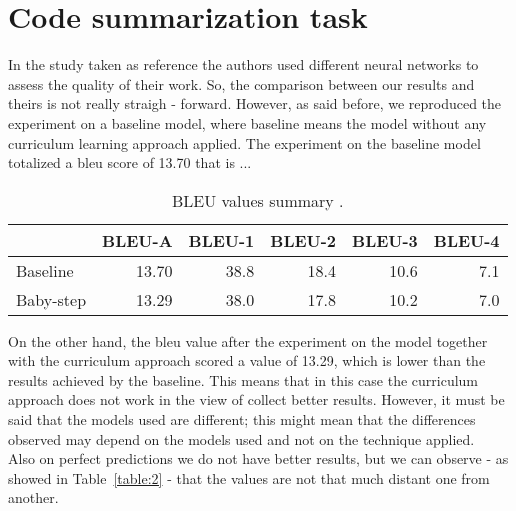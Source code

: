 \section{Code summarization task}
In the study taken as reference the authors used different neural networks to 
assess the quality of their work. So, the comparison between our results and theirs
is not really straigh - forward. However, as said before, we reproduced the experiment on a baseline model,
where baseline means the model without any curriculum learning approach applied.
The experiment on the baseline model totalized a bleu score of 13.70 that is ...
\begin{table}[h!]
    \centering
    \begin{tabular}{l|r|r|r|r|r}
     & BLEU-A & BLEU-1 & BLEU-2 & BLEU-3 & BLEU-4\\ [0.5ex] 
     \hline
     Baseline & 13.70 & 38.8 & 18.4 & 10.6 & 7.1\\  
     Baby-step & 13.29 & 38.0 & 17.8 & 10.2 & 7.0\\ [1ex]
     \end{tabular}
    \caption{BLEU values summary .}
    \label{table:1}
    \end{table}
On the other hand, the bleu value after the experiment on the model together with the curriculum approach
scored a value of 13.29, which is lower than the results achieved by the baseline.
This means that in this case the curriculum approach does not work in the view of collect better results.
However, it must be said that the models used are different; this might mean that the differences observed
may depend on the models used and not on the technique applied.\\
Also on perfect predictions we do not have better results, but we can observe - as showed in Table~\ref{table:2} - that the values are not 
that much distant one from another.

